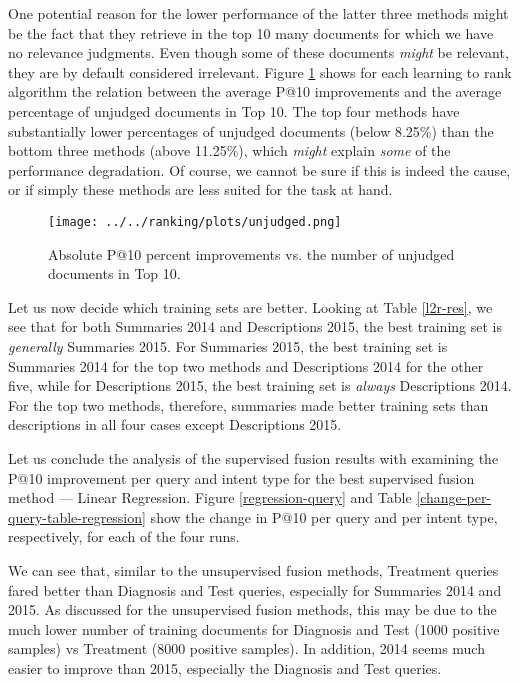 One potential reason for the lower performance of the latter three methods might be the fact that they retrieve in the top 10
many documents for which we have no relevance judgments. Even though some of these documents \emph{might} be relevant,
they are by default considered irrelevant.
Figure \ref{unjudged-fig} shows for each learning to rank algorithm
the relation between the average P@10 improvements and the average
percentage of unjudged documents in Top 10. The top four methods
have substantially lower percentages of unjudged documents (below 8.25\%) than the bottom
three methods (above 11.25\%), which \emph{might} explain \emph{some} of the performance degradation.
Of course, we cannot
be sure if this is indeed the cause, or if simply these methods are less suited for the task at hand.

\begin{figure}[h!]
\centerline{
  \texttt{[image: ../../ranking/plots/unjudged.png]}
  }
  \caption{Absolute P@10 percent improvements vs. the number of unjudged documents in Top 10.}
  \label{unjudged-fig}
\end{figure}

Let us now decide which training sets are better.
Looking at Table \ref{l2r-res}, we see that for both Summaries 2014 and Descriptions 2015, the best
training set is \emph{generally} Summaries 2015.
For Summaries 2015, the best training set
is Summaries 2014 for the top two methods and Descriptions 2014 for the other five,
while for Descriptions 2015, the best training set is \emph{always} Descriptions 2014.
For the top two methods, therefore, summaries made better training sets than descriptions in all
four cases except Descriptions 2015.

Let us conclude the analysis of the supervised fusion results with examining the P@10 improvement per query
and intent type
for the best supervised fusion method --- Linear Regression. Figure \ref{regression-query} and Table
\ref{change-per-query-table-regression} show the change in P@10
per query and per intent type, respectively, for each of the four runs.

We can see that, similar to the unsupervised fusion methods,
Treatment queries fared better than Diagnosis and Test queries, especially for Summaries 2014 and 2015.
As discussed for the unsupervised fusion methods, this may be due to the much lower number of training
documents for Diagnosis and Test (1000 positive samples) vs Treatment (8000 positive samples).
In addition, 2014 seems much easier to improve than 2015, especially the Diagnosis and Test queries.

